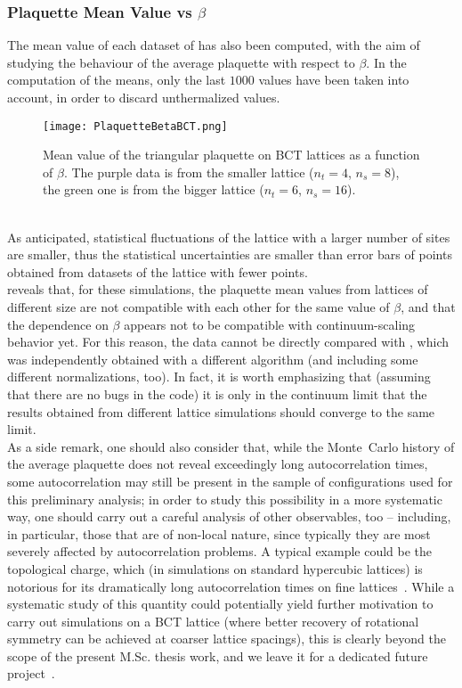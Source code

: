 \subsubsection{Plaquette Mean Value vs $\beta$}
The mean value of each dataset of  has also been computed, with the aim of studying the behaviour of the average plaquette with respect to $\beta$.
In the computation of the means, only the last $1000$ values have been taken into account, in order to discard unthermalized values.
\begin{figure}[!htbp]
    \centering
    \texttt{[image: PlaquetteBetaBCT.png]}
    \caption{Mean value of the triangular plaquette on BCT lattices as a function of $\beta$. The purple data is from the smaller lattice ($n_t=4$, $n_s=8$), the green one is from the bigger lattice ($n_t=6$, $n_s=16$).}
    \label{4F:PlaqBetaBCT}
\end{figure}\\
As anticipated, statistical fluctuations of the lattice with a larger number of sites are smaller, thus the statistical uncertainties are smaller than error bars of points obtained from datasets of the lattice with fewer points.\\
 reveals that, for these simulations, the plaquette mean values from lattices of different size are not compatible with each other for the same value of $\beta$, and that the dependence on $\beta$ appears not to be compatible with continuum-scaling behavior yet. For this reason, the data cannot be directly compared with , which was independently obtained with a different algorithm (and including some different normalizations, too). In fact, it is worth emphasizing that (assuming that there are no bugs in the code) it is only in the continuum limit that the results obtained from different lattice simulations should converge to the same limit.\\
As a side remark, one should also consider that, while the Monte~Carlo history of the average plaquette does not reveal exceedingly long autocorrelation times, some autocorrelation may still be present in the sample of configurations used for this preliminary analysis; in order to study this possibility in a more systematic way, one should carry out a careful analysis of other observables, too -- including, in particular, those that are of non-local nature, since typically they are most severely affected by autocorrelation problems. A typical example could be the topological charge, which (in simulations on standard hypercubic lattices) is notorious for its dramatically long autocorrelation times on fine lattices~\cite{Schaefer:2010hu}. While a systematic study of this quantity could potentially yield further motivation to carry out simulations on a BCT lattice (where better recovery of rotational symmetry can be achieved at coarser lattice spacings), this is clearly beyond the scope of the present M.Sc. thesis work, and we leave it for a dedicated future project~\cite{Aliberti:2024soa}.
